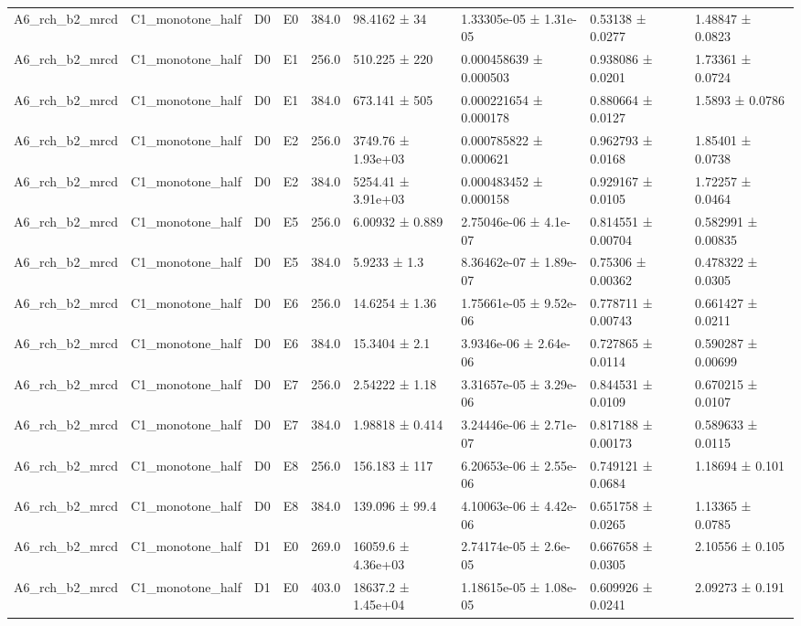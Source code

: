 \begin{table}
\begin{tabular}{lllllllll}
A6\_rch\_b2\_mrcd & C1\_monotone\_half & D0 & E0 & 384.0 & 98.4162 ± 34 & 1.33305e-05 ± 1.31e-05 & 0.53138 ± 0.0277 & 1.48847 ± 0.0823 \\
A6\_rch\_b2\_mrcd & C1\_monotone\_half & D0 & E1 & 256.0 & 510.225 ± 220 & 0.000458639 ± 0.000503 & 0.938086 ± 0.0201 & 1.73361 ± 0.0724 \\
A6\_rch\_b2\_mrcd & C1\_monotone\_half & D0 & E1 & 384.0 & 673.141 ± 505 & 0.000221654 ± 0.000178 & 0.880664 ± 0.0127 & 1.5893 ± 0.0786 \\
A6\_rch\_b2\_mrcd & C1\_monotone\_half & D0 & E2 & 256.0 & 3749.76 ± 1.93e+03 & 0.000785822 ± 0.000621 & 0.962793 ± 0.0168 & 1.85401 ± 0.0738 \\
A6\_rch\_b2\_mrcd & C1\_monotone\_half & D0 & E2 & 384.0 & 5254.41 ± 3.91e+03 & 0.000483452 ± 0.000158 & 0.929167 ± 0.0105 & 1.72257 ± 0.0464 \\
A6\_rch\_b2\_mrcd & C1\_monotone\_half & D0 & E5 & 256.0 & 6.00932 ± 0.889 & 2.75046e-06 ± 4.1e-07 & 0.814551 ± 0.00704 & 0.582991 ± 0.00835 \\
A6\_rch\_b2\_mrcd & C1\_monotone\_half & D0 & E5 & 384.0 & 5.9233 ± 1.3 & 8.36462e-07 ± 1.89e-07 & 0.75306 ± 0.00362 & 0.478322 ± 0.0305 \\
A6\_rch\_b2\_mrcd & C1\_monotone\_half & D0 & E6 & 256.0 & 14.6254 ± 1.36 & 1.75661e-05 ± 9.52e-06 & 0.778711 ± 0.00743 & 0.661427 ± 0.0211 \\
A6\_rch\_b2\_mrcd & C1\_monotone\_half & D0 & E6 & 384.0 & 15.3404 ± 2.1 & 3.9346e-06 ± 2.64e-06 & 0.727865 ± 0.0114 & 0.590287 ± 0.00699 \\
A6\_rch\_b2\_mrcd & C1\_monotone\_half & D0 & E7 & 256.0 & 2.54222 ± 1.18 & 3.31657e-05 ± 3.29e-06 & 0.844531 ± 0.0109 & 0.670215 ± 0.0107 \\
A6\_rch\_b2\_mrcd & C1\_monotone\_half & D0 & E7 & 384.0 & 1.98818 ± 0.414 & 3.24446e-06 ± 2.71e-07 & 0.817188 ± 0.00173 & 0.589633 ± 0.0115 \\
A6\_rch\_b2\_mrcd & C1\_monotone\_half & D0 & E8 & 256.0 & 156.183 ± 117 & 6.20653e-06 ± 2.55e-06 & 0.749121 ± 0.0684 & 1.18694 ± 0.101 \\
A6\_rch\_b2\_mrcd & C1\_monotone\_half & D0 & E8 & 384.0 & 139.096 ± 99.4 & 4.10063e-06 ± 4.42e-06 & 0.651758 ± 0.0265 & 1.13365 ± 0.0785 \\
A6\_rch\_b2\_mrcd & C1\_monotone\_half & D1 & E0 & 269.0 & 16059.6 ± 4.36e+03 & 2.74174e-05 ± 2.6e-05 & 0.667658 ± 0.0305 & 2.10556 ± 0.105 \\
A6\_rch\_b2\_mrcd & C1\_monotone\_half & D1 & E0 & 403.0 & 18637.2 ± 1.45e+04 & 1.18615e-05 ± 1.08e-05 & 0.609926 ± 0.0241 & 2.09273 ± 0.191 \\

\end{tabular}
\end{table}
